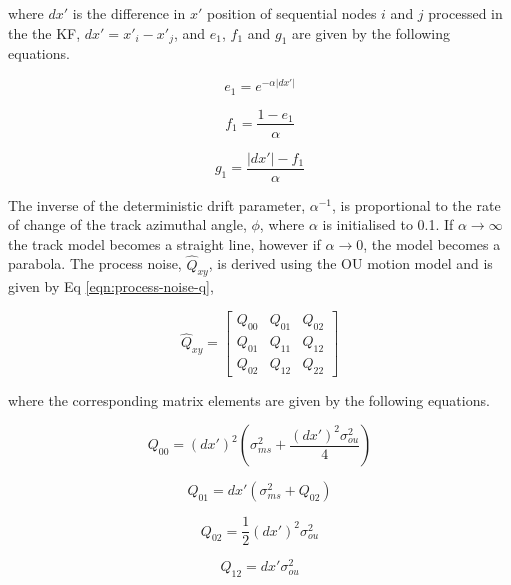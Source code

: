 where $dx'$ is the difference in $x'$ position of sequential nodes $i$ and $j$ processed in the the KF, $dx' = x'_i - x'_j$, and $e_1$, $f_1$ and $g_1$ are given by the following equations. 

\begin{equation}
e_1 = e^{- \alpha \lvert dx' \rvert}
\label{eqn:e1}
\end{equation}

\begin{equation}
f_1 = \frac{1 - e_1}{\alpha}
\label{eqn:f1}
\end{equation}

\begin{equation}
g_1 = \frac{\lvert dx' \rvert - f_1}{\alpha}
\label{eqn:g1}
\end{equation}

The inverse of the deterministic drift parameter, $\alpha^{-1}$, is proportional to the rate of change of the track azimuthal angle, $\phi$, where $\alpha$ is initialised to 0.1. If $\alpha \rightarrow \infty$ the track model becomes a straight line, however if $\alpha \rightarrow 0$, the model becomes a parabola. The process noise, $\hat{Q}_{xy}$, is derived using the OU motion model \cite{OU} and is given by Eq \eqref{eqn:process-noise-q}, 
 
\begin{equation}
\hat{Q}_{xy} = \begin{bmatrix} Q_{00} & Q_{01} & Q_{02} \\  Q_{01} & Q_{11} & Q_{12} \\ Q_{02} & Q_{12} & Q_{22} \end{bmatrix} 
\label{eqn:process-noise-q}
\end{equation}

where the corresponding matrix elements are given by the following equations.

\begin{equation}
Q_{00} = (dx')^{2} (\sigma_{ms}^{2} + \frac{(dx')^{2} \sigma_{ou}^{2}}{4})
\label{eqn:q00}
\end{equation}


\begin{equation}
Q_{01} = dx'( \sigma_{ms}^2 + Q_{02} )
\label{eqn:q01}
\end{equation}

\begin{equation}
Q_{02} = \frac{1}{2} (dx')^2 \sigma_{ou}^{2}
\label{eqn:q02}
\end{equation}

\begin{equation}
Q_{12} = dx' \sigma_{ou}^{2}
\label{eqn:q12}
\end{equation}

